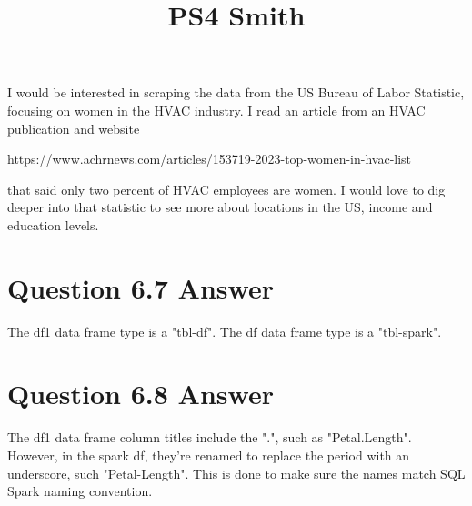 \documentclass{article}
\title{PS4 Smith}
\begin{document}
\maketitle

I would be interested in scraping the data from the US Bureau of Labor Statistic, focusing on women in the HVAC industry. I read an article from an HVAC publication and website

    https://www.achrnews.com/articles/153719-2023-top-women-in-hvac-list

that said only two percent of HVAC employees are women. I would love to dig deeper into that statistic to see more about locations in the US, income and education levels.
\space

\section{Question 6.7 Answer}
The df1 data frame type is a "tbl-df". The df data frame type is a "tbl-spark".
\space
\section{Question 6.8 Answer}
The df1 data frame column titles include the ".", such as "Petal.Length". However, in the spark df, they're renamed to replace the period with an underscore, such "Petal-Length". This is done to make sure the names match SQL Spark naming convention.
\end{document}
